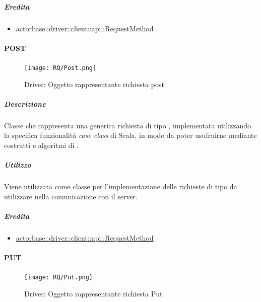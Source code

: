 \documentclass{scalatekids-article}
\begin{document}
\subparagraph{Eredita}

\begin{itemize}
\item \hyperref[sec:actorbase::driver::client::api::RequestMethod]{actorbase::driver::client::api::RequestMethod}
\end{itemize}


\paragraph{POST}
\label{sec:actorbase::driver::client::api::POST}

\begin{figure}[H]
  \begin{center}
    \texttt{[image: RQ/Post.png]}
    \caption{Driver: Oggetto rappresentante richiesta post}
  \end{center}
\end{figure}

\subparagraph{Descrizione}

Classe che rappresenta una generica richiesta  di tipo
, implementata utilizzando la specifica funzionalità \textit{case
  class} di Scala, in modo da poter usufruirne mediante costrutti e algoritmi di
.

\subparagraph{Utilizzo}

Viene utilizzata come classe per l'implementazione delle richieste 
di tipo  da utilizzare nella comunicazione con il server.

\subparagraph{Eredita}

\begin{itemize}
\item \hyperref[sec:actorbase::driver::client::api::RequestMethod]{actorbase::driver::client::api::RequestMethod}
\end{itemize}


\paragraph{PUT}
\label{sec:actorbase::driver::client::api::PUT}

\begin{figure}[H]
  \begin{center}
    \texttt{[image: RQ/Put.png]}
    \caption{Driver: Oggetto rappresentante richiesta Put}
  \end{center}
\end{figure}
\end{document}
